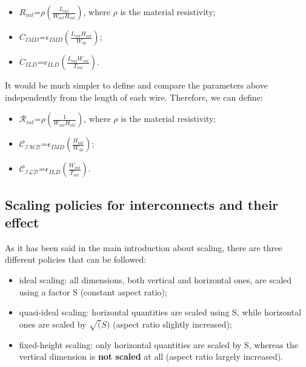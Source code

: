 \documentclass[a4paper, 12pt, twoside, openright]{report}
\begin{document}
\begin{itemize}
\item $R_{int}$=$\rho(\frac{L_{int}}{W_{int}H_{int}})$, where $\rho$ is the material resistivity;
\item $C_{IMD}$=$\epsilon_{IMD}(\frac{L_{int}H_{int}}{W_{sp}})$;
\item $C_{ILD}$=$\epsilon_{ILD}(\frac{L_{int}W_{int}}{T_{int}})$.
\end{itemize}

It would be much simpler to define and compare the parameters above independently from the length of each wire. Therefore, we can define:
\begin{itemize}
\item $\mathcal{R}_{int}$=$\rho(\frac{1}{W_{int}H_{int}})$, where $\rho$ is the material resistivity;
\item $\mathcal{C_{IMD}}$=$\epsilon_{IMD}(\frac{H_{int}}{W_{sp}})$;
\item $\mathcal{C_{ILD}}$=$\epsilon_{ILD}(\frac{W_{int}}{T_{int}})$.
\end{itemize}

\subsection{Scaling policies for interconnects and their effect}
As it has been said in the main introduction about scaling, there are three different policies that can be followed:
\begin{itemize}
\item ideal scaling: all dimensions, both vertical and horizontal ones, are scaled using a factor S (constant aspect ratio);
\item quasi-ideal scaling: horizontal quantities are scaled using S, while horizontal ones are scaled by $\sqrt(S)$ (aspect ratio slightly increased); 
\item fixed-height scaling: only horizontal quantities are scaled by S, whereas the vertical dimension is \textbf{not scaled} at all (aspect ratio largely increased). 
\end{itemize}
\end{document}
